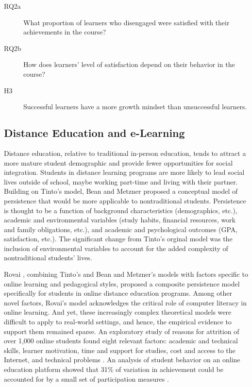 \documentclass{sigchi}\usepackage[]{graphicx}\usepackage[]{color}
\begin{document}
\begin{description}
  \item[RQ2a] What proportion of learners who disengaged were satisfied with their achievements in the course?
  \item[RQ2b] How does learners' level of satisfaction depend on their behavior in the course?
  \item[H3] Successful learners have a more growth mindset than unsuccessful learners.
\end{description}

\subsection{Distance Education and e-Learning}

Distance education, relative to traditional in-person education, tends to attract a more mature student demographic and provide fewer opportunities for social integration. Students in distance learning programs are more likely to lead social lives outside of school, maybe working part-time and living with their partner. Building on Tinto's model, Bean and Metzner \citeyear{bean1985conceptual} proposed a conceptual model of persistence that would be more applicable to nontraditional students. Persistence is thought to be a function of background characteristics (demographics, etc.), academic and environmental variables (study habits, financial resources, work and family obligations, etc.), and academic and psychological outcomes (GPA, satisfaction, etc.). The significant change from Tinto's orginal model was the inclusion of environmental variables to account for the added complexity of nontraditional students' lives.

Rovai \citeyear{rovai2003search}, combining Tinto's and Bean and Metzner's models with factors specific to online learning and pedagogical styles, proposed a composite persistence model specifically for students in online distance education programs. Among other novel factors, Rovai's model acknowledges the critical role of computer literacy in online learning. And yet, these increasingly complex theoretical models were difficult to apply to real-world settings, and hence, the empirical evidence to support them remained sparse. An exploratory study of reasons for attrition of over 1,000 online students found eight relevant factors: academic and technical skills, learner motivation, time and support for studies, cost and access to the Internet, and technical problems \cite{muilenburg2005student}. An analysis of student behavior on an online education platform showed that 31\% of variation in achievement could be accounted for by a small set of participation measures \cite{morris2005tracking}.
\end{document}
